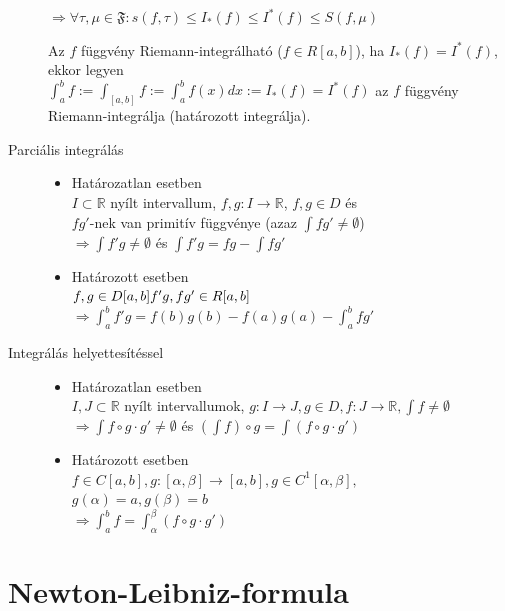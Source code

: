 \documentclass[margin=0px]{article}
\newcommand{\R}{\mathbb{R}}
\begin{document}
\begin{description}
				$ \Rightarrow \forall \tau,\mu \in \mathfrak{F} : s(f, \tau) \leq I_*(f) \leq I^*(f) \leq S(f,\mu) $
				
				Az $ f $ függvény Riemann-integrálható ($ f \in R[a,b] $), ha $ I_*(f) = I^*(f) $, ekkor legyen \\
				$ \int_{a}^{b}f := \int_{[a,b]}f := \int_{a}^{b}f(x) dx := I_*(f) = I^*(f) $ az $f$ függvény Riemann-integrálja (határozott integrálja).
				
				\item[Parciális integrálás] \hfill
					\begin{itemize}
						\item Határozatlan esetben \hfill \\
							$ I \subset \R $ nyílt intervallum, $ f,g : I \rightarrow \R $, $f,g \in D$ és \\
							$ fg'$-nek van primitív függvénye (azaz $ \int fg' \neq \emptyset $)\\
							$ \Rightarrow \int f'g \neq \emptyset $ és $ \int f'g = fg - \int fg' $
						\item Határozott esetben \hfill \\
							$ f,g \in D[a,b] \\ f'g, f g' \in R[a,b] $ \\
							$ \Rightarrow \int_a^b f'g = f(b)g(b) - f(a)g(a) - \int_a^b fg'$
					\end{itemize}

				\item[Integrálás helyettesítéssel] \hfill 
					\begin{itemize}
						\item Határozatlan esetben \hfill \\
							$ I,J \subset \R $ nyílt intervallumok, $g: I \rightarrow J,  g \in D, f:J \rightarrow \R, \int f \neq \emptyset $ \\
							$\Rightarrow \int f \circ g\cdot g' \neq \emptyset $ és $ (\int f) \circ g = \int(f\circ g\cdot g') $
						\item Határozott esetben \hfill \\
							$ f \in C[a,b], g : [\alpha,\beta] \rightarrow [a,b], g \in C^1[\alpha,\beta],$\\
							$g(\alpha) = a, g(\beta) = b $ \\
							$ \Rightarrow \int_a^b f = \int_{\alpha}^{\beta} (f\circ g \cdot g')$
					\end{itemize}
		\end{description}
	\section{Newton-Leibniz-formula}
		
\end{document}
